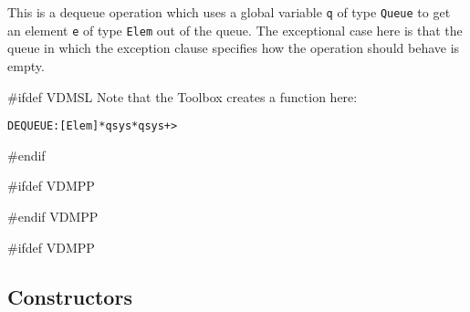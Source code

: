 \documentclass[\pformat,12pt]{article}
\begin{document}
\begin{description}
This is a dequeue operation which uses a global variable {\tt q} of
type {\tt Queue} to get an element {\tt e} of type {\tt Elem} out of
the queue. The exceptional case here is that the queue in
which the exception clause specifies how the operation should
behave is empty.

#ifdef VDMSL
Note that the Toolbox creates a function here:
\begin{alltt}
  DEQUEUE: [Elem] * qsys * qsys +> 
\end{alltt}
#endif

#ifdef VDMPP

%
%

#endif VDMPP

\end{description}

#ifdef VDMPP
\subsection{Constructors}\label{constructors}
\end{document}
